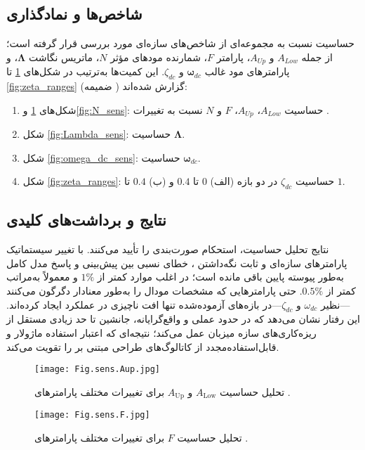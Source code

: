 \subsection{شاخص‌ها و نمادگذاری}
حساسیت نسبت به مجموعه‌ای از شاخص‌های سازه‌ای مورد بررسی قرار گرفته است؛ از جمله $A_{Low}$ و $A_{Up}$، پارامتر $F$، شمارنده مودهای مؤثر $N$، ماتریس نگاشت $\mathbf{\Lambda}$، و پارامترهای مود غالب $\mathbf{\omega}_{dc}$ و $\zeta_{dc}$. این کمیت‌ها به‌ترتیب در شکل‌های \ref{fig:ALowAUp} تا \ref{fig:zeta_ranges} (ضمیمه ) گزارش شده‌اند:
\begin{enumerate}
  \item شکل‌های \ref{fig:ALowAUp} و\ref{fig:N_sens}: حساسیت $A_{Low}$، $A_{Up}$، $F$ و $N$ نسبت به تغییرات .
  \item شکل \ref{fig:Lambda_sens}: حساسیت $\mathbf{\Lambda}$.
  \item شکل \ref{fig:omega_dc_sens}: حساسیت $\mathbf{\omega}_{dc}$.
  \item شکل \ref{fig:zeta_ranges}: حساسیت $\zeta_{dc}$ در دو بازه (الف) $0$ تا $0.4$ و (ب) $0.4$ تا $1$.
\end{enumerate}


\subsection{نتایج و برداشت‌های کلیدی}
نتایج تحلیل حساسیت، استحکام صورت‌بندی  را تأیید می‌کنند. با تغییر سیستماتیک پارامترهای سازه‌ای و ثابت نگه‌داشتن ، خطای نسبی بین پیش‌بینی  و پاسخ  مدل کامل به‌طور پیوسته پایین باقی مانده است؛ در اغلب موارد کمتر از $1\%$ و معمولاً به‌مراتب کمتر از $0.5\%$. حتی پارامترهایی که مشخصات مودال را به‌طور معنادار دگرگون می‌کنند—نظیر $\omega_{dc}$ و $\zeta_{dc}$—در بازه‌های آزموده‌شده تنها افت ناچیزی در عملکرد  ایجاد کرده‌اند. این رفتار نشان می‌دهد که در حدود عملی و واقع‌گرایانه، جانشین  تا حد زیادی مستقل از ریزه‌کاری‌های سازه میزبان عمل می‌کند؛ نتیجه‌ای که اعتبار استفاده ماژولار و قابل‌استفاده‌مجدد از کاتالوگ‌های طراحی مبتنی بر  را تقویت می‌کند.


\begin{figure}[htbp]
  \centering
    \texttt{[image: Fig.sens.Aup.jpg]}
  \caption{تحلیل حساسیت $A_{\mathrm{Low}}$ و $A_{\mathrm{Up}}$ برای تغییرات مختلف پارامترهای .}
  \label{fig:ALowAUp}
\end{figure}

\begin{figure}[htbp]
  \centering
  \texttt{[image: Fig.sens.F.jpg]}
  \caption{تحلیل حساسیت $F$ برای تغییرات مختلف پارامترهای .}
  \label{fig:F_sens}
\end{figure}

